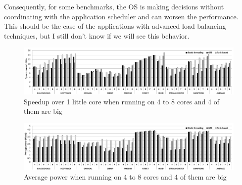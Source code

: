 Consequently, for some benchmarks, the OS is making decisions without coordinating with the application scheduler and can worsen the performance. This should be the case of the applications with advanced load balancing techniques, but I still don't know if we will see this behavior.
\fi
\begin{figure}[t]%
	\centering
	\includegraphics[width=1.0\textwidth]{figures/speedup-4plus.pdf}
	\vspace{-0.5cm}
	\caption{Speedup over 1 little core when running on 4 to 8 cores and 4 of them are big}
	\label{fig:speedup4plus}%
	\vspace{-0.3cm}
\end{figure}

\begin{figure}[t]%
	\centering
	\includegraphics[width=1.0\textwidth]{figures/power4plus.pdf}
	\vspace{-0.5cm}
	\caption{Average power when running on 4 to 8 cores and 4 of them are big}
	\label{fig:power4plus}%
	\vspace{-0.5cm}
\end{figure}



